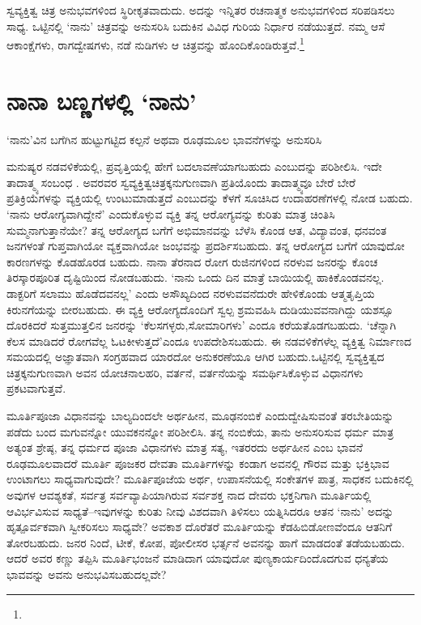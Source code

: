ಸ್ವವ್ಯಕ್ತಿತ್ವ ಚಿತ್ರ ಅನುಭವಗಳಿಂದ ಸ್ಥಿರೀಕೃತವಾದುದು. ಅದನ್ನು ಇನ್ನಿತರ ರಚನಾತ್ಮಕ ಅನುಭವಗಳಿಂದ ಸರಿಪಡಿಸಲು ಸಾಧ್ಯ. ಒಟ್ಟಿನಲ್ಲಿ ‘ನಾನು’ ಚಿತ್ರವನ್ನು ಅನುಸರಿಸಿ ಬದುಕಿನ ವಿವಿಧ ಗುರಿಯ ನಿರ್ಧಾರ ನಡೆಯುತ್ತದೆ. ನಮ್ಮ ಆಸೆ ಆಕಾಂಕ್ಷೆಗಳು, ರಾಗದ್ವೇಷಗಳು, ನಡೆ ನುಡಿಗಳು ಆ ಚಿತ್ರವನ್ನು ಹೊಂದಿಕೊಂಡಿರುತ್ತವೆ.\footnote{\hfill{}}


\section*{ನಾನಾ ಬಣ್ಣಗಳಲ್ಲಿ ‘ನಾನು’}


{\parfillskip=0pt ‘ನಾನು’ವಿನ ಬಗೆಗಿನ ಹುಟ್ಟುಗಟ್ಟಿದ ಕಲ್ಪನೆ ಅಥವಾ ರೂಢಮೂಲ ಭಾವನೆಗಳನ್ನು ಅನುಸರಿಸಿ\par}\newpage\noindent ಮನುಷ್ಯರ ನಡವಳಿಕೆಯಲ್ಲಿ, ಪ್ರವೃತ್ತಿಯಲ್ಲಿ ಹೇಗೆ ಬದಲಾವಣೆಯಾಗಬಹುದು ಎಂಬುದನ್ನು ಪರಿಶೀಲಿಸಿ. ಇದೇ ತಾದಾತ್ಮ್ಯ ಸಂಬಂಧ . ಅವರವರ ಸ್ವವ್ಯಕ್ತಿತ್ವಚಿತ್ರಕ್ಕನುಗುಣವಾಗಿ ಪ್ರತಿಯೊಂದು ತಾದಾತ್ಮ್ಯವೂ ಬೇರೆ ಬೇರೆ ಪ್ರತಿಕ್ರಿಯೆಗಳನ್ನು ವ್ಯಕ್ತಿಯಲ್ಲಿ ಉಂಟುಮಾಡುತ್ತದೆ ಎಂಬುದನ್ನು ಕೆಳಗೆ ಸೂಚಿಸಿದ ಉದಾಹರಣೆಗಳಲ್ಲಿ ನೋಡ ಬಹುದು. ‘ನಾನು ಆರೋಗ್ಯವಾಗಿದ್ದೇನೆ’ ಎಂದುಕೊಳ್ಳುವ ವ್ಯಕ್ತಿ ತನ್ನ ಆರೋಗ್ಯವನ್ನು ಕುರಿತು ಮಾತ್ರ ಚಿಂತಿಸಿ ಸುಮ್ಮನಾಗುತ್ತಾನೆಯೇ? ತನ್ನ ಆರೋಗ್ಯದ ಬಗೆಗೆ ಅಭಿಮಾನವನ್ನು ಬೆಳೆಸಿ ಕೊಂಡ ಆತ, ವಿದ್ಯಾವಂತ, ಧನವಂತ ಜನಗಳಂತೆ ಗುಪ್ತವಾಗಿಯೋ ವ್ಯಕ್ತವಾಗಿಯೋ ಜಂಭವನ್ನು ಪ್ರದರ್ಶಿಸಬಹುದು. ತನ್ನ ಆರೋಗ್ಯದ ಬಗೆಗೆ ಯಾವುದೋ ಕಾರಣಗಳನ್ನು ಕೊಡಹೊರಡ ಬಹುದು. ನಾನಾ ತೆರನಾದ ರೋಗ ರುಜಿನಗಳಿಂದ ನರಳುವ ಜನರನ್ನು ಕೊಂಚ ತಿರಸ್ಕಾರಪೂರಿತ ದೃಷ್ಟಿಯಿಂದ ನೋಡಬಹುದು. ‘ನಾನು ಒಂದು ದಿನ ಮಾತ್ರೆ ಬಾಯಿಯಲ್ಲಿ ಹಾಕಿಕೊಂಡವನಲ್ಲ. ಡಾಕ್ಟರಿಗೆ ಸಲಾಮು ಹೊಡೆದವನಲ್ಲ’ ಎಂದು ಅಸೌಖ್ಯದಿಂದ ನರಳುವವನೆದುರೇ ಹೇಳಿಕೊಂಡು ಆತ್ಮತೃಪ್ತಿಯ ಕಿರುನಗೆಯನ್ನು ಬೀರಬಹುದು. ಈ ವ್ಯಕ್ತಿ ಆರೋಗ್ಯದೊಂದಿಗೆ ಸ್ವಲ್ಪ ಶ್ರಮವಹಿಸಿ ದುಡಿಯುವವನಾಗಿದ್ದು ಯಶಸ್ಸೂ ದೊರಕಿದರೆ ಸುತ್ತಮುತ್ತಲಿನ ಜನರನ್ನು ‘ಕೆಲಸಗಳ್ಳರು,\break ಸೋಮಾರಿಗಳು’ ಎಂದೂ ಕರೆಯತೊಡಗಬಹುದು. ‘ಚೆನ್ನಾಗಿ ಕೆಲಸ ಮಾಡಿದರೆ ರೋಗವೆಲ್ಲ ಓಟಕೀಳುತ್ತದೆ’ಎಂದೂ ಉಪದೇಶಿಸಬಹುದು. ಈ ನಡವಳಿಕೆಗಳೆಲ್ಲ ವ್ಯಕ್ತಿತ್ವ ನಿರ್ಮಾಣದ ಸಮಯದಲ್ಲಿ ಅಜ್ಞಾತವಾಗಿ ಸಂಗ್ರಹವಾದ ಯಾರದೋ ಅನುಕರಣೆಯೂ ಆಗಿರ ಬಹುದು.\break ಒಟ್ಟಿನಲ್ಲಿ ಸ್ವವ್ಯಕ್ತಿತ್ವದ ಚಿತ್ರಕ್ಕನುಗುಣವಾಗಿ ಅವನ ಯೋಚನಾಲಹರಿ, ವರ್ತನೆ, ವರ್ತನೆಯನ್ನು ಸಮರ್ಥಿಸಿಕೊಳ್ಳುವ ವಿಧಾನಗಳು ಪ್ರಕಟವಾಗುತ್ತವೆ.

ಮೂರ್ತಿಪೂಜಾ ವಿಧಾನವನ್ನು ಬಾಲ್ಯದಿಂದಲೇ ಅರ್ಥಹೀನ, ಮೂಢನಂಬಿಕೆ ಎಂದು\break ದ್ವೇಷಿಸುವಂತೆ ತರಬೇತಿಯನ್ನು ಪಡೆದು ಬಂದ ಮಗುವನ್ನೋ ಯುವಕನನ್ನೋ ಪರಿಶೀಲಿಸಿ. ತನ್ನ ನಂಬಿಕೆಯ, ತಾನು ಅನುಸರಿಸುವ ಧರ್ಮ ಮಾತ್ರ ಅತ್ಯಂತ ಶ್ರೇಷ್ಠ, ತನ್ನ ಧರ್ಮದ ಪೂಜಾ ವಿಧಾನಗಳು ಮಾತ್ರ ಸತ್ಯ, ಇತರರದು ಅರ್ಥಹೀನ ಎಂಬ ಭಾವನೆ ರೂಢಮೂಲವಾದರೆ ಮೂರ್ತಿ ಪೂಜಕರ ದೇವತಾ ಮೂರ್ತಿಗಳನ್ನು ಕಂಡಾಗ ಅವನಲ್ಲಿ ಗೌರವ ಮತ್ತು ಭಕ್ತಿಭಾವ ಉಂಟಾಗಲು ಸಾಧ್ಯವಾಗುವುದೇ? ಮೂರ್ತಿಪೂಜೆಯ ಅರ್ಥ, ಉಪಾಸನೆಯಲ್ಲಿ ಸಂಕೇತಗಳ ಪಾತ್ರ, ಸಾಧಕನ ಬದುಕಿನಲ್ಲಿ ಅವುಗಳ ಆವಶ್ಯಕತೆ, ಸರ್ವತ್ರ ಸರ್ವವ್ಯಾಪಿಯಾಗಿರುವ ಸರ್ವಶಕ್ತ ನಾದ ದೇವರು ಭಕ್ತನಿಗಾಗಿ ಮೂರ್ತಿಯಲ್ಲಿ ಆವಿರ್ಭವಿಸುವ ಸಾಧ್ಯತೆ–ಇವುಗಳನ್ನು ಕುರಿತು ನೀವು ವಿಶದವಾಗಿ ತಿಳಿಸಲು ಯತ್ನಿಸಿದರೂ ಆತನ ‘ನಾನು’ ಅದನ್ನು ಹೃತ್ಪೂರ್ವಕವಾಗಿ ಸ್ವೀಕರಿಸಲು ಸಾಧ್ಯವೇ? ಅವಕಾಶ ದೊರೆತರೆ ಮೂರ್ತಿಯನ್ನು ಕೆಡಹಿಬಿಡೋಣವೆಂದೂ ಆತನಿಗೆ ತೋರಬಹುದು. ಜನರ ನಿಂದೆ, ಟೀಕೆ, ಕೋಪ, ಪೋಲೀಸರ ಭರ್ತ್ಸನೆ ಅವನನ್ನು ಹಾಗೆ ಮಾಡದಂತೆ ತಡೆಯಬಹುದು. ಆದರೆ ಅವರ ಕಣ್ಣು ತಪ್ಪಿಸಿ ಮೂರ್ತಿಭಂಜನೆ ಮಾಡಿದಾಗ ಯಾವುದೋ ಪುಣ್ಯಕಾರ್ಯದಿಂದೊದಗುವ ಧನ್ಯತೆಯ ಭಾವವನ್ನು ಅವನು ಅನುಭವಿಸಬಹುದಲ್ಲವೇ?

